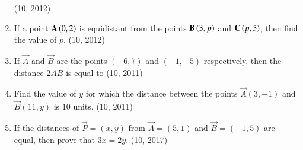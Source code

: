 \begin{enumerate}[label=\thesubsection.\arabic*, ref=\thesubsection.\theenumi]
\hfill (10, 2012)
\item If a point $\mathbf{A}\left(0,2\right)$ is equidistant from the points $\mathbf{B}\left(3,p\right)$ and $\mathbf{C}\left(p,5\right)$, then find the value of $p$. 
\hfill (10, 2012)
\item If $\vec{A}$ and $\vec{B}$ are the points $(-6, 7)$ and $(-1, -5)$ respectively, then the distance $2AB$ is equal to
\hfill (10, 2011)
\item Find the value of $y$ for which the distance between the points $\vec{A}(3, -1)$ and $\vec{B}(11, y)$ is $10$ units.
\hfill (10, 2011)
\item If the distances of $\vec{P} = (x, y)$ from $\vec{A} = (5, 1)$ and $\vec{B} = (-1, 5)$ are equal, then prove that $3x = 2y$. \hfill (10, 2017)
\end{enumerate}
